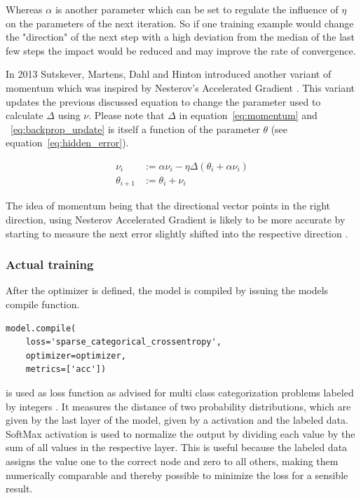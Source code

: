 Whereas $\alpha$ is another parameter which can be set to regulate the influence of $\eta$ on the parameters of the next iteration.
So if one training example would change the "direction" of the next step with a high deviation from the median of the last few steps the impact would be reduced and may improve the rate of convergence.

In 2013 Sutskever, Martens, Dahl and Hinton \cite{Sutskever2013} introduced another variant of momentum which was inspired by Nesterov's Accelerated Gradient \cite{Nesterov1983}.
This variant updates the previous discussed equation to change the parameter used to calculate $\varDelta$ using $\nu$.
Please note that $\varDelta$ in equation~\eqref{eq:momentum} and ~\eqref{eq:backprop_update} is itself a function of the parameter $\theta$ (see equation~\eqref{eq:hidden_error}).

\begin{equation}
    \begin{split}
    \nu_i & := \alpha \nu_i - \eta \varDelta(\theta_i + \alpha \nu_i) \\
    \theta_{i+1} & := \theta_i + \nu_i
    \end{split}
    \label{eq:nesterov}
\end{equation}

The idea of momentum being that the directional vector points in the right direction, using Nesterov Accelerated Gradient is likely to be more accurate by starting to measure the next error slightly shifted into the respective direction \cite[p.353]{Geron2019} \cite[p.291]{Goodfellow2017}.

\subsubsection{Actual training}

After the optimizer is defined, the model is compiled by issuing the models compile function.

\begin{lstlisting}
model.compile(
    loss='sparse_categorical_crossentropy', 
    optimizer=optimizer,
    metrics=['acc'])
\end{lstlisting}

 is used as loss function as advised for multi class categorization problems labeled by integers \cite[p.84]{Chollet2017}.
It measures the distance of two probability distributions, which are given by the last layer of the model, given by a  activation and the labeled data.
SoftMax activation is used to normalize the output by dividing each value by the sum of all values in the respective layer.
This is useful because the labeled data assigns the value one to the correct node and zero to all others, making them numerically comparable and thereby possible to minimize the loss for a sensible result.


